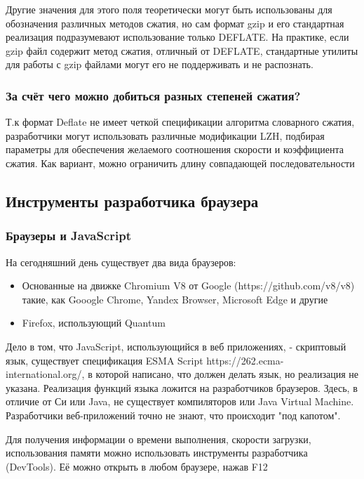 \documentclass[12pt]{article}
\begin{document}
Другие значения для этого поля теоретически могут быть использованы для обозначения
различных методов сжатия, но сам формат gzip и его стандартная реализация подразумевают
использование только DEFLATE. На практике, если gzip файл содержит метод сжатия,
отличный от DEFLATE, стандартные утилиты для работы с gzip файлами могут его не поддерживать
и не распознать.

\subsubsection{За счёт чего можно добиться разных степеней сжатия?}

Т.к формат Deflate не имеет четкой спецификации алгоритма словарного сжатия,
разработчики могут использовать различные модификации LZH, подбирая параметры для
обеспечения желаемого соотношения скорости и коэффициента сжатия.
Как вариант, можно ограничить длину совпадающей последовательности

\subsection{Инструменты разработчика браузера}

\subsubsection{Браузеры и JavaScript}

На сегодняшний день существует два вида браузеров:

\begin{itemize}[label=-]
    \item Основанные на движке Chromium V8 от Google (https://github.com/v8/v8) такие,
          как Gooogle Chrome, Yandex Browser, Microsoft Edge и другие
    \item Firefox, использующий Quantum
\end{itemize}

Дело в том, что JavaScript, использующийся в веб приложениях,
- скриптовый язык, существует спецификация ESMA Script https://262.ecma-international.org/,
в которой написано, что должен делать язык, но реализация не указана.
Реализация функций языка ложится на разработчиков браузеров.
Здесь, в отличие от Си или Java, не существует компиляторов или Java Virtual Machine.
Разработчики веб-приложений точно не знают, что происходит "под капотом".

Для получения информации о времени выполнения, скорости загрузки,
использования памяти можно использовать инструменты разработчика (DevTools).
Её можно открыть в любом браузере, нажав F12
\end{document}
